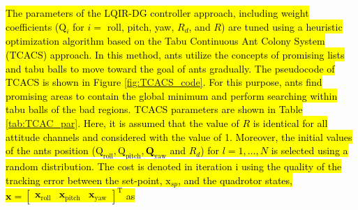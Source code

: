 \documentclass[3p]{elsarticle}
\begin{document}



\hl{
The parameters of the LQIR-DG controller approach, including weight coefficients ($\boldsymbol{\mathrm{Q}}_i$ for $i=$ roll, pitch, yaw, $R_d$, and $R$) are tuned using a heuristic optimization algorithm based on the Tabu Continuous Ant Colony System (TCACS) {\cite{article_TCACS}} approach. In this method, ants utilize the concepts of promising lists and tabu balls to move toward the goal of ants gradually. The pseudocode of TCACS is shown in Figure {\ref{fig:TCACS_code}}. For this purpose, ants find promising areas to contain the global minimum and perform searching within tabu balls of the bad regions. TCACS parameters are shown in Table {\ref{tab:TCAC_par}}.
Here, it is assumed that the value of $R$ is identical for all attitude channels and considered with the value of 1. Moreover, the initial values of the ants position ($ \boldsymbol{\mathrm{Q}}_{\text{roll}}, \boldsymbol{\mathrm{Q}}_{\text{pitch}}, \boldsymbol{{Q}}_{\text{yaw}}$ and $R_d$) for $l=1, \ldots, N$ is selected using a random distribution. The cost is denoted in iteration i using the quality of the tracking error between the set-point, $\boldsymbol{\mathrm{x}}_{sp}$, and the quadrotor states, $\boldsymbol{x} = \begin{bmatrix}
    \boldsymbol{x}_{\text{roll}} & \boldsymbol{x}_{\text{pitch}} & \boldsymbol{x}_{\text{yaw}}
\end{bmatrix}^{\mathrm{T}}$ as}

\end{document}
